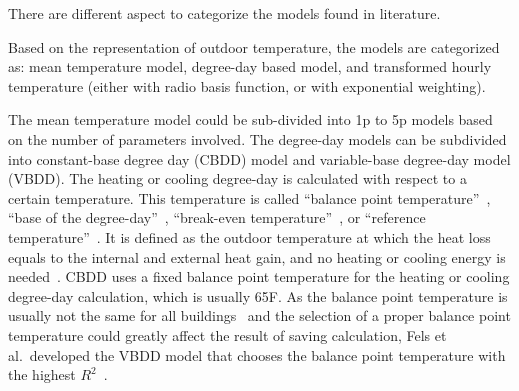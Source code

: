\documentclass[12pt]{article}
\begin{document}

There are different aspect to categorize the models found in
literature.
 
Based on the representation of outdoor temperature, the models are
categorized as: mean temperature model, degree-day based model, and
transformed hourly temperature (either with radio basis function, or
with exponential weighting). 

The mean temperature model could be sub-divided into 1p to 5p models
based on the number of parameters involved. The degree-day models can
be subdivided into constant-base degree day (CBDD) model and
variable-base degree-day model (VBDD). The heating or cooling degree-day is
calculated with respect to a certain temperature. This temperature is
called ``balance point temperature''~\cite{edition2013ashrae}, ``base
of the degree-day''~\cite{edition2013ashrae}, ``break-even
temperature''~\cite{fels1986prism}, or ``reference
temperature''~\cite{fels1986prism, Zhang2015177, fels1986prism}. It is
defined as the outdoor temperature at which the heat loss equals to
the internal and external heat gain, and no heating or cooling energy
is needed~\cite{edition2013ashrae}.
%
CBDD uses a fixed balance point temperature for the heating or cooling
degree-day calculation, which is usually 65F. As the balance point
temperature is usually not the same for all
buildings~\cite{fels1986prism} and the selection of a proper balance
point temperature could greatly affect the result of saving
calculation, Fels et al.\ developed the VBDD model that chooses the
balance point temperature with the highest $R^2$~\cite{kissock2003}.
\end{document}
